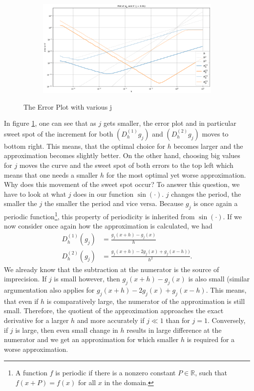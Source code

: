 \begin{figure}[h!]
\begin{subfigure}[b]{0.49\linewidth}
    \end{subfigure}
    \begin{subfigure}[b]{0.49\linewidth}
        \includegraphics[width=\linewidth]{graphics/j_error_plot/tiny_j.png}
    \end{subfigure}
    \caption{The Error Plot with various j}
    \label{fig:exp2_j}
\end{figure}

In figure \ref{fig:exp2_j}, one can see that as \(j\) gets smaller, the error plot and in particular sweet spot of the increment for both \((D^{(1)}_h g_j)\) and \((D^{(2)}_h g_j)\) moves to bottom right. This means, that the optimal choice for \(h\) becomes larger and the approximation becomes slightly better. On the other hand, choosing big values for \(j\) moves the curve and the sweet spot of both errors to the top left which means that one needs a smaller \(h\) for the most optimal yet worse approximation.
Why does this movement of the sweet spot occur? To answer this question, we have to look at what \(j\) does in our function \(\sin(\cdot)\). \(j\) changes the period, the smaller the \(j\) the smaller the period and vice versa. Because \(g_j\) is once again a periodic function\footnote{A function \(f\) is periodic if there is a nonzero constant \(P \in \mathbb{R}\), such that \(f(x + P) = f(x)\) for all \(x\) in the domain.}, this property of periodicity is inherited from \(\sin(\cdot)\). If we now consider once again how the approximation is calculated, we had
\begin{align*}
    D^{(1)}_h (g_j) &= \frac{g_j(x + h) - g_j(x)}{h} \\
    D^{(2)}_h (g_j) &= \frac{g_j(x + h) - 2 g_j(x) + g_j(x - h))}{h^2}\text{.}
\end{align*}
We already know that the subtraction at the numerator is the source of imprecision. If \(j\) is small however, then \(g_j(x + h) - g_j(x)\) is also small (similar argumentation also applies for \(g_j(x + h) - 2 g_j(x) + g_j(x - h)\). This means, that even if \(h\) is comparatively large, the numerator of the approximation is still small. Therefore, the quotient of the approximation approaches the exact derivative for a larger \(h\) and more accurately if \(j \ll 1\) than for \(j = 1\). Conversely, if \(j\) is large, then even small change in \(h\) results in large difference at the numerator and we get an approximation for which smaller \(h\) is required for a worse approximation.